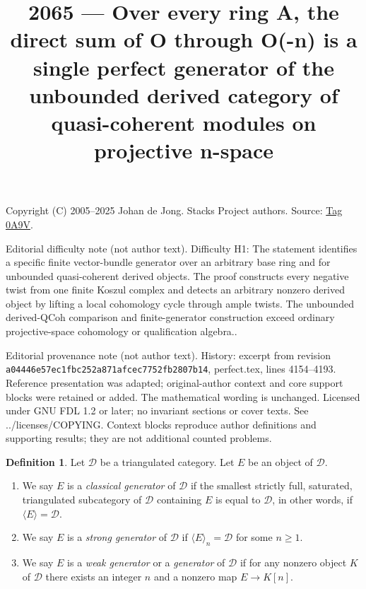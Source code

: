 \documentclass{amsart}
\theoremstyle{plain}
\theoremstyle{definition}
\newtheorem{definition}[subsection]{Definition}
\theoremstyle{remark}
\numberwithin{equation}{subsection}
\begin{document}
\title[Stacks Project, Tag 0A9V]{2065 --- Over every ring A, the direct sum of O through O(-n) is a single perfect generator of the unbounded derived category of quasi-coherent modules on projective n-space}
\maketitle
\noindent Copyright (C) 2005--2025 Johan de Jong. Stacks Project authors. Source: \href{https://stacks.math.columbia.edu/tag/0A9V}{Tag 0A9V}.

\noindent Editorial difficulty note (not author text). Difficulty H1: The statement identifies a specific finite vector-bundle generator over an arbitrary base ring and for unbounded quasi-coherent derived objects. The proof constructs every negative twist from one finite Koszul complex and detects an arbitrary nonzero derived object by lifting a local cohomology cycle through ample twists. The unbounded derived-QCoh comparison and finite-generator construction exceed ordinary projective-space cohomology or qualification algebra..

\noindent Editorial provenance note (not author text). History: excerpt from revision \texttt{a0444\allowbreak 6e57e\allowbreak c1fbc\allowbreak 252a8\allowbreak 71afc\allowbreak ec775\allowbreak 2fb28\allowbreak 07b14}, perfect.tex, lines 4154--4193. Reference presentation was adapted; original-author context and core support blocks were retained or added. The mathematical wording is unchanged. Licensed under GNU FDL 1.2 or later; no invariant sections or cover texts. See ../licenses/COPYING. Context blocks reproduce author definitions and supporting results; they are not additional counted problems.

\begin{definition}
\label{derived-definition-generators}
Let $\mathcal{D}$ be a triangulated category. Let $E$ be an object
of $\mathcal{D}$.
\begin{enumerate}
\item We say $E$ is a {\it classical generator} of $\mathcal{D}$
if the smallest strictly full, saturated, triangulated subcategory
of $\mathcal{D}$ containing $E$ is equal to $\mathcal{D}$, in
other words, if $\langle E \rangle = \mathcal{D}$.
\item We say $E$ is a {\it strong generator} of $\mathcal{D}$
if $\langle E \rangle_n = \mathcal{D}$ for some $n \geq 1$.
\item We say $E$ is a {\it weak generator} or a {\it generator}
of $\mathcal{D}$
if for any nonzero object $K$ of $\mathcal{D}$ there exists
an integer $n$ and a nonzero map $E \to K[n]$.
\end{enumerate}
\end{definition}
\end{document}
